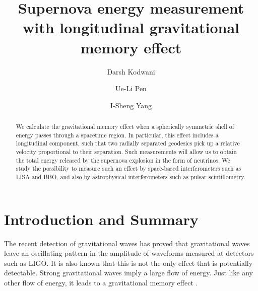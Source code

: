 \documentclass[aps,showpacs,twocolumn,floats,prd,superscriptaddress,nofootinbib]{revtex4-1}
\begin{document}
\title{Supernova energy measurement with longitudinal gravitational memory effect}

\author{Darsh Kodwani}

\author{Ue-Li Pen}

\author{I-Sheng Yang}

\begin{abstract}
We calculate the gravitational memory effect when a spherically symmetric shell of energy passes through a spacetime region. In particular, this effect includes a longitudinal component, such that two radially separated geodesics pick up a relative velocity proportional to their separation. Such measurements will allow us to obtain the total energy released by the supernova explosion in the form of neutrinos. We study the possibility to measure such an effect by space-based interferometers such as LISA and BBO, and also by astrophysical interferometers such as pulsar scintillometry.
\end{abstract}

\maketitle

\section{Introduction and Summary}

The recent detection of gravitational waves \cite{GW1509} has proved that gravitational waves leave an oscillating pattern in the amplitude of waveforms measured at detectors such as LIGO. It is also known that this is not the only effect that is potentially detectable. Strong gravitational waves imply a large flow of energy. Just like any other flow of energy, it leads to a gravitational memory effect \cite{Christodoulou_effect,GW_memory}. 
\end{document}
